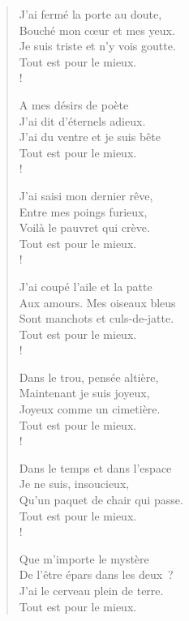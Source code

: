 \documentclass[french,twoside]{book} %
\begin{document}
\begin{verse}
J’ai fermé la porte au doute,\\
Bouché mon cœur et mes yeux.\\
Je suis triste et n’y vois goutte.\\
Tout est pour le mieux.\\!

A mes désirs de poète\\
J’ai dit d’éternels adieux.\\
J’ai du ventre et je suis bête\\
Tout est pour le mieux.\\!

J’ai saisi mon dernier rêve,\\
Entre mes poings furieux,\\
Voilà le pauvret qui crève.\\
Tout est pour le mieux.\\!

J’ai coupé l’aile et la patte\\
Aux amours. Mes oiseaux bleus\\
Sont manchots et culs-de-jatte.\\
Tout est pour le mieux.\\!

Dans le trou, pensée altière,\\
Maintenant je suis joyeux,\\
Joyeux comme un cimetière.\\
Tout est pour le mieux.\\!

Dans le temps et dans l’espace\\
Je ne suis, insoucieux,\\
Qu’un paquet de chair qui passe.\\
Tout est pour le mieux.\\!

Que m’importe le mystère\\
De l’être épars dans les deux ?\\
J’ai le cerveau plein de terre.\\
Tout est pour le mieux.\\
\end{verse}
\end{document}
